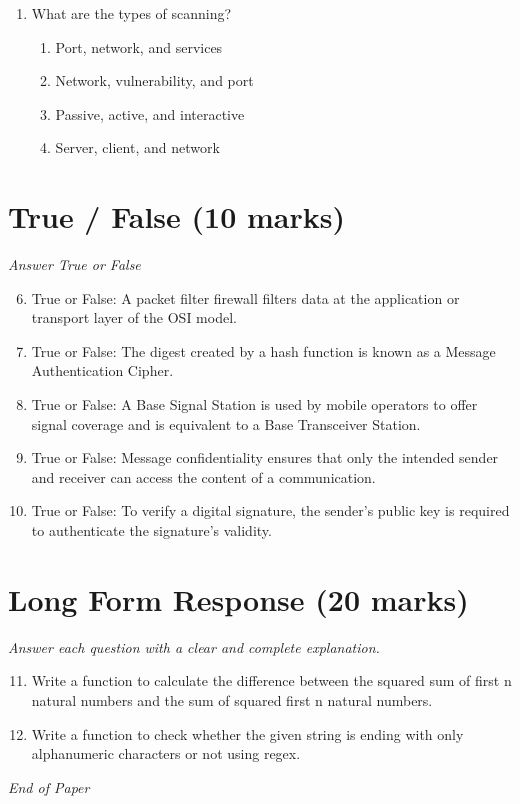 \documentclass[12pt]{article}
\begin{document}
\begin{enumerate}[label=\arabic*.]
\begin{enumerate}[label=(\alph*)]
    \item AP-handshaking
    \item 4-way handshake
    \item 4-way connection
    \item wireless handshaking
\end{enumerate}
\item What are the types of scanning?
\begin{enumerate}[label=(\alph*)]
    \item Port, network, and services
    \item Network, vulnerability, and port
    \item Passive, active, and interactive
    \item Server, client, and network
\end{enumerate}
\end{enumerate}

\section*{True / False (10 marks)}
\textit{Answer True or False}
\begin{enumerate}[label=\arabic*.]
\setcounter{enumi}{5}
\item True or False: A packet filter firewall filters data at the application or transport layer of the OSI model.
\item True or False: The digest created by a hash function is known as a Message Authentication Cipher.
\item True or False: A Base Signal Station is used by mobile operators to offer signal coverage and is equivalent to a Base Transceiver Station.
\item True or False: Message confidentiality ensures that only the intended sender and receiver can access the content of a communication.
\item True or False: To verify a digital signature, the sender's public key is required to authenticate the signature's validity.
\end{enumerate}

\section*{Long Form Response (20 marks)}
\textit{Answer each question with a clear and complete explanation.}
\begin{enumerate}[label=\arabic*.]
\setcounter{enumi}{10}
\item Write a function to calculate the difference between the squared sum of first n natural numbers and the sum of squared first n natural numbers.
\item Write a function to check whether the given string is ending with only alphanumeric characters or not using regex.
\end{enumerate}

\vfill
\noindent\textit{End of Paper}
\end{document}
